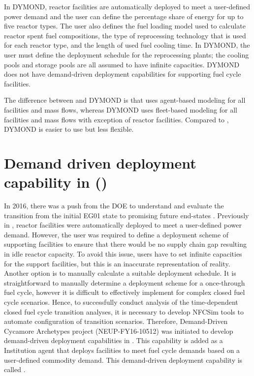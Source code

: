 In DYMOND, reactor facilities are automatically deployed to 
meet a user-defined power demand and the user can define 
the percentage share of energy for up to five reactor types. 
The user also defines the fuel loading model used to calculate 
reactor spent fuel compositions, the type of reprocessing 
technology that is used for each reactor type, and the length 
of used fuel cooling time. 
In DYMOND, the user must define the deployment schedule for 
the reprocessing plants; the cooling pools and storage pools 
are all assumed to have infinite capacities. 
DYMOND does not have demand-driven deployment capabilities for 
supporting fuel cycle facilities. 

The difference between \Cyclus and DYMOND is that \Cyclus uses 
agent-based modeling for all facilities and mass flows, 
whereas DYMOND uses fleet-based modeling for all facilities and 
mass flows with exception of reactor facilities. 
Compared to \Cyclus, DYMOND is easier to use but less flexible. 

\section{Demand driven deployment capability in \Cyclus (\deploy)}
In 2016, there was a push from the DOE to understand and evaluate the 
transition from the initial EG01 state to promising future 
end-states \cite{feng_standardized_2016}.
Previously in \Cyclus, reactor facilities were automatically 
deployed to meet a user-defined power demand. 
However, the user was required to define a deployment scheme of 
supporting facilities to ensure that there would be no supply chain 
gap resulting in idle reactor capacity. 
To avoid this issue, users 
have to set infinite capacities for the support facilities, 
but this is an inaccurate representation of reality. 
Another option is to manually calculate a suitable deployment 
schedule. 
It is straightforward to manually determine a deployment scheme 
for a once-through fuel cycle, however it is difficult to effectively 
implement for complex closed fuel cycle scenarios.  
Hence, to successfully conduct analysis of the time-dependent 
closed fuel cycle transition
analyses, it is necessary to develop \gls{NFCSim} tools to  
automate configuration of transition scenarios.  
Therefore, Demand-Driven Cycamore Archetypes project
(NEUP-FY16-10512) was initiated to develop demand-driven deployment 
capabilities in \Cyclus.
This capability is added as a \Cyclus Institution
agent that deploys facilities to meet 
fuel cycle demands based on a user-defined commodity demand. 
This demand-driven deployment capability is called 
\deploy. 

